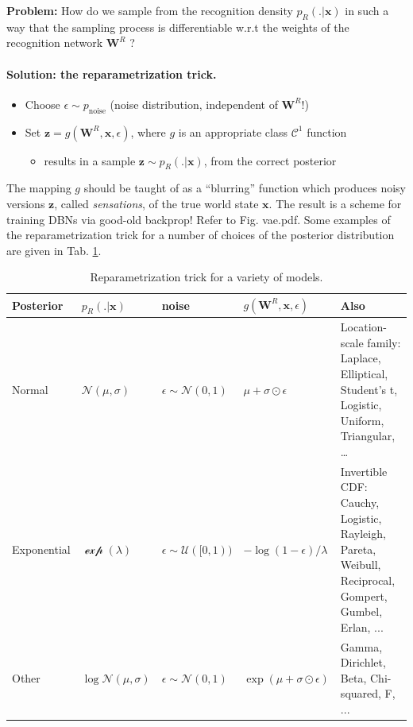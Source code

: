 \documentclass[10pt,letterpaper]{article}
\def\z{\mathbf{z}}
\def\W{\mathbf{W}}
\def\x{\mathbf{x}}
\begin{document}
\begin{mdframed}
  \textbf{Problem:} How do we sample from the recognition density $p_R(.|\x)$ in such a way that the sampling process is differentiable w.r.t the weights of the recognition network $\W^R$ ?
\end{mdframed}


\paragraph{Solution: the reparametrization trick.}
\begin{itemize}
\item Choose $\epsilon \sim p_{\text{noise}}$ (noise distribution, independent of $\W^R$!)
\item Set $\z = g(\W^{R}, \x, \epsilon)$, where $g$ is an appropriate class $\mathcal C^1$ function
  \begin{itemize}
  \item results in a sample $\z \sim p_R(.|\x)$, from the correct
    posterior
    \end{itemize}
\end{itemize}
The mapping $g$ should be taught of as a ``blurring'' function which produces noisy versions $\z$,
called \textit{sensations}, of the true world state $\x$.
The result is a scheme for training DBNs via good-old backprop!
Refer to Fig. vae.pdf.
Some examples of the reparametrization trick for a number of
choices of the posterior distribution are given in Tab. \ref{tab:rptrick}.

\begin{table}[H]
  \begin{tabular}{p{1.7cm}|p{1.5cm}|p{1.9cm}|p{2.1cm}|p{5cm}}
         \hline
         Posterior & $p_R(.|\x)$ & noise & $g(\W^R,\x,\epsilon)$ & Also \\ \hline
         Normal & $\mathcal N(\mu,\sigma)$ & $\epsilon \sim \mathcal N(0, 1)$ & $\mu + \sigma \odot \epsilon$ & Location-scale family: Laplace, Elliptical,
         Student’s t, Logistic, Uniform, Triangular, \ldots \\ \hline
         Exponential & $\mathcal \exp(\lambda)$ & $\epsilon \sim \mathcal U([0, 1))$ & $-\log(1-\epsilon)/\lambda$ & Invertible CDF: Cauchy, Logistic, Rayleigh, Pareta, Weibull, Reciprocal, Gompert, Gumbel, Erlan, ... \\ \hline
         Other & $\log\mathcal N(\mu,\sigma)$ & $\epsilon \sim \mathcal N(0, 1)$ & $\exp(\mu + \sigma \odot \epsilon)$ & Gamma, Dirichlet, Beta, Chi-squared, F, ... \\ \hline
  \end{tabular}
  \caption{Reparametrization trick \citep{kingma2013auto} for a variety of models.}
  \label{tab:rptrick}
\end{table}
\end{document}
